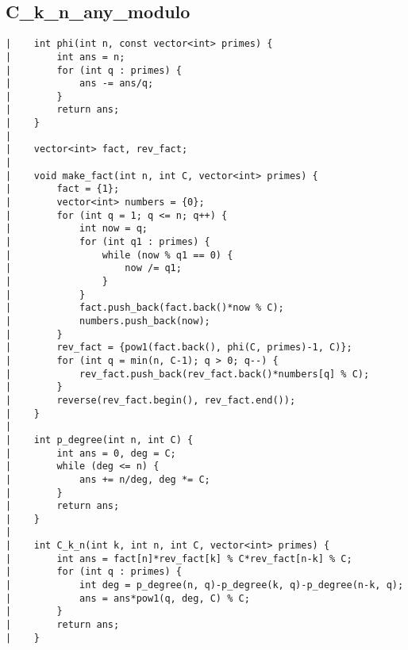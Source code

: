 \documentclass[a4paper, 10pt]{article}
\begin{document}
\begin{center}
\section*{C\_k\_n\_any\_modulo}
\begin{verbatim}
|    int phi(int n, const vector<int> primes) {
|        int ans = n;
|        for (int q : primes) {
|            ans -= ans/q;
|        }
|        return ans;
|    }
|    
|    vector<int> fact, rev_fact;
|    
|    void make_fact(int n, int C, vector<int> primes) {
|        fact = {1};
|        vector<int> numbers = {0};
|        for (int q = 1; q <= n; q++) {
|            int now = q;
|            for (int q1 : primes) {
|                while (now % q1 == 0) {
|                    now /= q1;
|                }
|            }
|            fact.push_back(fact.back()*now % C);
|            numbers.push_back(now);
|        }
|        rev_fact = {pow1(fact.back(), phi(C, primes)-1, C)};
|        for (int q = min(n, C-1); q > 0; q--) {
|            rev_fact.push_back(rev_fact.back()*numbers[q] % C);
|        }
|        reverse(rev_fact.begin(), rev_fact.end());
|    }
|    
|    int p_degree(int n, int C) {
|        int ans = 0, deg = C;
|        while (deg <= n) {
|            ans += n/deg, deg *= C;
|        }
|        return ans;
|    }
|    
|    int C_k_n(int k, int n, int C, vector<int> primes) {
|        int ans = fact[n]*rev_fact[k] % C*rev_fact[n-k] % C;
|        for (int q : primes) {
|            int deg = p_degree(n, q)-p_degree(k, q)-p_degree(n-k, q);
|            ans = ans*pow1(q, deg, C) % C;
|        }
|        return ans;
|    }
\end{verbatim}


\end{center}
\end{document}
